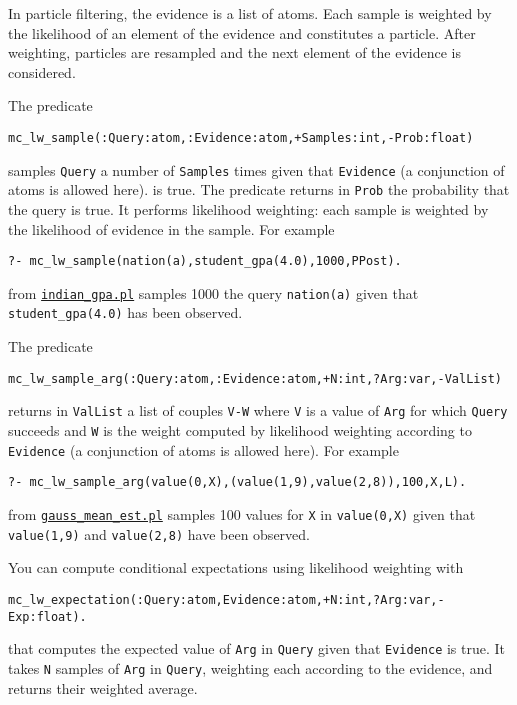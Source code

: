 In particle filtering, the evidence is a list of atoms. Each sample is weighted by the
likelihood of an element of the evidence and constitutes a particle. 
After weighting, particles are resampled and the next element of the evidence
is considered.

 The predicate 
\begin{verbatim}
mc_lw_sample(:Query:atom,:Evidence:atom,+Samples:int,-Prob:float)
\end{verbatim}
samples \verb|Query|  a number of \verb|Samples| times given that \verb|Evidence|
(a conjunction of atoms is allowed here). is true.
The predicate returns in \verb|Prob| the probability that the query is true.
It performs likelihood weighting: each sample is weighted by the
likelihood of evidence in the sample.
For example
\begin{verbatim}
?- mc_lw_sample(nation(a),student_gpa(4.0),1000,PPost).
\end{verbatim}
from \href{http://cplint.lamping.unife.it/example/inference/indian_gpa.pl}{\texttt{indian\_gpa.pl}} samples 1000 the query
\verb|nation(a)| given that \verb|student_gpa(4.0)| has been observed.


 The predicate 
\begin{verbatim}
mc_lw_sample_arg(:Query:atom,:Evidence:atom,+N:int,?Arg:var,-ValList)
\end{verbatim}
returns in \verb|ValList| a list of couples \verb|V-W| where \verb|V| is a value of \verb|Arg| 
for which \verb|Query| succeeds and \verb|W| is the
weight computed by likelihood weighting
according to \verb|Evidence| (a conjunction of atoms is allowed here).
For example
\begin{verbatim}
?- mc_lw_sample_arg(value(0,X),(value(1,9),value(2,8)),100,X,L).
\end{verbatim}
from \href{http://cplint.lamping.unife.it/example/inference/gauss_mean_est.pl}{\texttt{gauss\_mean\_est.pl}} samples 100 values for \verb|X| in
\verb|value(0,X)| given that \verb|value(1,9)| and \verb|value(2,8)| have been observed.

You can compute conditional expectations using likelihood weighting with 
\begin{verbatim}
mc_lw_expectation(:Query:atom,Evidence:atom,+N:int,?Arg:var,-Exp:float).
\end{verbatim}
that computes the expected value of \verb|Arg| in \verb|Query| given that
\verb|Evidence| is true.
It takes \verb|N| samples of  \verb|Arg| in \verb|Query|, weighting each according
to the evidence, and returns their weighted average.



